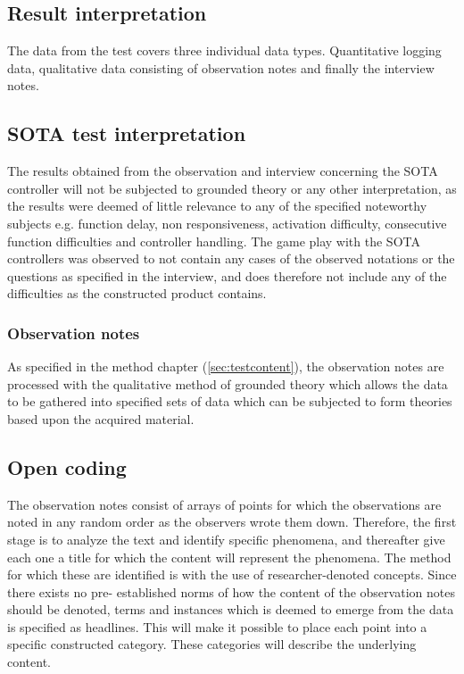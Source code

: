 \subsection{Result interpretation} \label{sec:analysisresults}
The data from the test covers three individual data types. 
Quantitative logging data, qualitative data consisting of observation notes and finally the interview notes.

\subsection{SOTA test interpretation}
The results obtained from the observation and interview concerning the SOTA controller will  not be subjected to grounded theory or any other interpretation, as the results were deemed of little relevance to any of the specified noteworthy subjects e.g. function delay, non responsiveness, activation difficulty, consecutive function difficulties and controller handling. The game play with the SOTA controllers was observed to not contain any cases of the observed notations or the questions as specified in the interview, and does therefore not include any of the difficulties as the constructed product contains.

\subsubsection{Observation notes}
As specified in the method chapter (\ref{sec:testcontent}), the observation notes are processed with the qualitative method of grounded theory which allows the data to be gathered into specified sets of data which can be subjected to form theories based upon the acquired material.



\subsection*{Open coding}
The observation notes consist of arrays of points for which the observations are noted in any random order as the observers wrote them down. 
Therefore, the first stage is to analyze the text and identify specific phenomena, and thereafter give each one a title for which the content will represent the phenomena. 
The method for which these are identified is with the use of researcher-denoted concepts. 
Since there exists no pre- established norms of how the content of the observation notes should be denoted, terms and instances which is deemed to emerge from the data is specified as headlines. 
This will make it possible to place each point into a specific constructed category. 
These categories will describe the underlying content.


